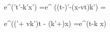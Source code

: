 
\\

e^{\pm \imath(\omega't'-k'x')}
=e^{ \pm \imath{}((t-)\omega'-(x-vt)k')} = 

e^{\pm \imath {}((\omega'+ vk')t - (k'+)x)} 
=e^{\pm \imath(\omega t-k x)}
                           
